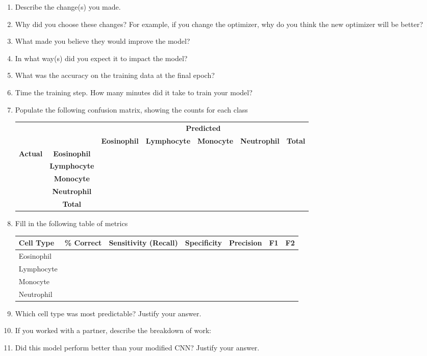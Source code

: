\documentclass[11pt]{article}
\renewcommand\:{\colon} %
\begin{document}
\begin{enumerate}
\item Describe the change(s) you made.
\item Why did you choose these changes?  For example, if you change the optimizer, why do you think the new optimizer will be better?
\item What made you believe they would improve the model?  
\item In what way(s) did you expect it to impact the model?
\item What was the accuracy on the training data at the final epoch? 

\item Time the training step. How many minutes did it take to train your model?

\item Populate the following confusion matrix, showing the counts for each class

\begin{tabular}{|l|c|c|c|c|c|c|} \hline
\multicolumn{2}{|c|}{ } &  \multicolumn{5}{|c|}{\textbf{Predicted}}  \\ \cline{3-7}
\multicolumn{2}{|c|}{ } & \textbf{Eosinophil} & \textbf{Lymphocyte} & \textbf{Monocyte} & \textbf{Neutrophil} & \textbf{Total}   \\ \hline
\multirow{ 4}{*}{\textbf{Actual}}& \textbf{Eosinophil}  & & & & & \\ \cline{2-7}
& \textbf{Lymphocyte}    & & & & & \\ \cline{2-7}
& \textbf{Monocyte}    & & & & & \\ \cline{2-7}
& \textbf{Neutrophil}   & & & & &\\ \cline{2-7}
& \textbf{Total} & & & & & \\ \hline
\end{tabular}

\item Fill in the following table of metrics


\begin{tabular}{|l|c|c|c|c|c|c|} \hline
\textbf{Cell Type} & \textbf{\% Correct} & \textbf{Sensitivity (Recall)} & \textbf{Specificity} & \textbf{Precision} & \textbf{F1} & \textbf{F2} \\ \hline
Eosinophil & & & & & & \\ \hline
Lymphocyte &  & & & & & \\ \hline
Monocyte &  & & & & & \\ \hline
Neutrophil & & & & & & \\ \hline
\end{tabular}
\item Which cell type was most predictable? Justify your answer.


\item If you worked with a partner, describe the breakdown of work:


\item Did this model perform better than your modified CNN? Justify your answer.

\end{enumerate}
\end{document}
